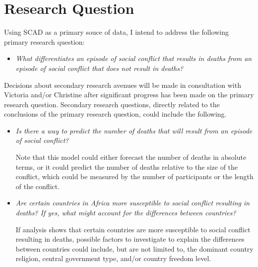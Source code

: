 \documentclass{article}
\begin{document}
\section{Research Question}
Using SCAD as a primary souce of data, I intend to address the following primary research question:

\begin{itemize}
\item[]\textit{What differentiates an episode of social conflict that results in deaths from an episode of social conflict that does not result in deaths?}
\end{itemize}
Decisions about secondary research avenues will be made in consultation with Victoria and/or Christine after significant progress has been made on the primary research question.  Secondary research questions, directly related to the conclusions of the primary research question, could include the following.
\begin{itemize}
\item\textit{Is there a way to predict the number of deaths that will result from an episode of social conflict?}

Note that this model could either forecast the number of deaths in absolute terms, or it could predict the number of deaths relative to the size of the conflict, which could be measured by the number of participants or the length of the conflict.
\item\textit{Are certain countries in Africa more susceptible to social conflict resulting in deaths?  If yes, what might account for the differences between countries?}

If analysis shows that certain countries are more susceptible to social conflict resulting in deaths, possible factors to investigate to explain the differences between countries could include, but are not limited to, the dominant country religion, central government type, and/or country freedom level.
\end{itemize}
\end{document}
